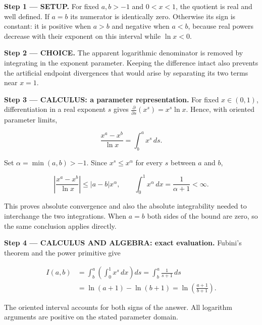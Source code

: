 \documentclass[11pt,oneside,openany]{book}
\begin{document}
\textbf{Step 1 --- SETUP.} For fixed \(a,b>-1\) and \(0<x<1\), the quotient is real and well defined. If \(a=b\) its numerator is identically zero. Otherwise its sign is constant: it is positive when \(a>b\) and negative when \(a<b\), because real powers decrease with their exponent on this interval while \(\ln x<0\).

\begin{ChoiceStep}
\textbf{Step 2 --- CHOICE.} The apparent logarithmic denominator is removed by integrating in the exponent parameter. Keeping the difference intact also prevents the artificial endpoint divergences that would arise by separating its two terms near \(x=1\).

\end{ChoiceStep}
\textbf{Step 3 --- CALCULUS: a parameter representation.} For fixed \(x\in(0,1)\), differentiation in a real exponent \(s\) gives \(\frac{\partial}{\partial s}(x^s)=x^s\ln x\). Hence, with oriented parameter limits,

\[
\frac{x^a-x^b}{\ln x}=\int_b^a x^s\,ds.
\]

Set \(\alpha=\min(a,b)>-1\). Since \(x^s\le x^\alpha\) for every \(s\) between \(a\) and \(b\),

\[
\left|\frac{x^a-x^b}{\ln x}\right|
\le|a-b|x^\alpha,
\qquad \int_0^1x^\alpha\,dx=\frac{1}{\alpha+1}<\infty.
\]

This proves absolute convergence and also the absolute integrability needed to interchange the two integrations. When \(a=b\) both sides of the bound are zero, so the same conclusion applies directly.

\textbf{Step 4 --- CALCULUS AND ALGEBRA: exact evaluation.} Fubini's theorem and the power primitive give

\[
\begin{aligned}
I(a,b)&=\int_b^a\left(\int_0^1x^s\,dx\right)ds
=\int_b^a\frac{1}{s+1}\,ds\\
&=\ln(a+1)-\ln(b+1)
=\ln\left(\frac{a+1}{b+1}\right).
\end{aligned}
\]

The oriented interval accounts for both signs of the answer. All logarithm arguments are positive on the stated parameter domain.
\end{document}
